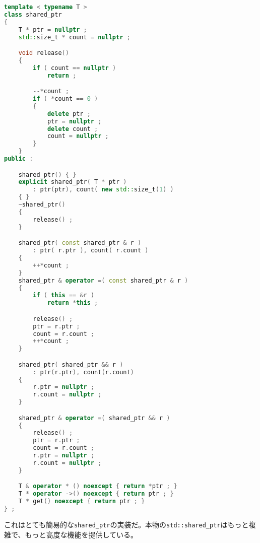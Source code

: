 \begin{lstlisting}[language={C++}]
template < typename T >
class shared_ptr
{
    T * ptr = nullptr ;
    std::size_t * count = nullptr ;

    void release()
    {
        if ( count == nullptr )
            return ;

        --*count ;
        if ( *count == 0 )
        {
            delete ptr ;
            ptr = nullptr ;
            delete count ;
            count = nullptr ;
        }
    }
public :

    shared_ptr() { }
    explicit shared_ptr( T * ptr )
        : ptr(ptr), count( new std::size_t(1) )
    { }
    ~shared_ptr()
    {
        release() ;
    }

    shared_ptr( const shared_ptr & r )
        : ptr( r.ptr ), count( r.count )
    {
        ++*count ;
    }
    shared_ptr & operator =( const shared_ptr & r )
    {
        if ( this == &r )
            return *this ;

        release() ;
        ptr = r.ptr ;
        count = r.count ;
        ++*count ;
    }

    shared_ptr( shared_ptr && r )
        : ptr(r.ptr), count(r.count)
    {
        r.ptr = nullptr ;
        r.count = nullptr ;
    }

    shared_ptr & operator =( shared_ptr && r )
    {
        release() ;
        ptr = r.ptr ;
        count = r.count ;
        r.ptr = nullptr ;
        r.count = nullptr ;
    }

    T & operator * () noexcept { return *ptr ; }
    T * operator ->() noexcept { return ptr ; } 
    T * get() noexcept { return ptr ; }
} ;
\end{lstlisting}

これはとても簡易的な\texttt{shared\_ptr}の実装だ。本物の\texttt{std::shared\_ptr}はもっと複雑で、もっと高度な機能を提供している。
